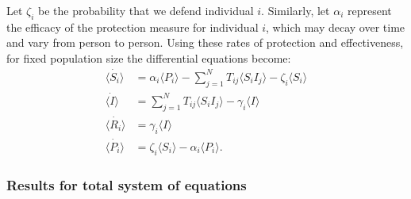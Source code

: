 \documentclass[../report.tex]{subfiles}
\begin{document}
Let $\zeta_i$ be the probability that we defend individual $i$.
Similarly, let $\alpha_i$ represent the efficacy of the protection measure for individual $i$, which may decay over time and vary from person to person. Using these rates of protection and effectiveness, for fixed population size the differential equations become:
\begin{align}
\dot{\langle S_i \rangle} & = \alpha_i \langle P_i \rangle - \sum^{N}_{j=1}T_{ij} \langle S_i I_j \rangle - \zeta_i\langle S_i \rangle\\
\dot{\langle I \rangle} & =\sum^{N}_{j=1}T_{ij}\langle S_i I_j \rangle - \gamma_i \langle I \rangle \\
\dot{\langle R_i \rangle} & = \gamma_i \langle I \rangle \\
\dot{\langle P_i \rangle} & = \zeta_i \langle S_i \rangle - \alpha_i \langle P_i \rangle.
\end{align} 

\subsubsection{Results for total system of equations}
\end{document}
